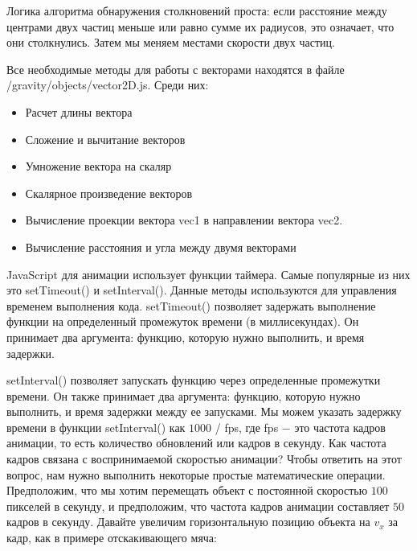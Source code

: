 Логика алгоритма обнаружения столкновений проста: если расстояние между центрами двух частиц меньше или равно сумме их радиусов, это означает, что они столкнулись. Затем мы меняем местами скорости двух частиц. \cite{canvas14}

Все необходимые методы для работы с векторами находятся в файле /gravity/objects/vector2D.js. Среди них:

\begin{itemize}
    \item Расчет длины вектора
    \item Сложение и вычитание векторов
    \item Умножение вектора на скаляр
    \item Скалярное произведение векторов
    \item Вычисление проекции вектора vec1 в направлении вектора vec2.
    \item Вычисление расстояния и угла между двумя векторами
\end{itemize}

JavaScript для анимации использует функции таймера. Самые популярные из них это setTimeout() и setInterval(). Данные методы используются для управления временем выполнения кода. setTimeout() позволяет задержать выполнение функции на определенный промежуток времени (в миллисекундах). Он принимает два аргумента: функцию, которую нужно выполнить, и время задержки.

setInterval() позволяет запускать функцию через определенные промежутки времени. Он также принимает два аргумента: функцию, которую нужно выполнить, и время задержки между ее запусками. Мы можем указать задержку времени в функции setInterval() как $1000$ / fps, где fps $-$ это частота кадров анимации, то есть количество обновлений или кадров в секунду. Как частота кадров связана с воспринимаемой скоростью анимации? Чтобы ответить на этот вопрос, нам нужно выполнить некоторые простые математические операции. Предположим, что мы хотим перемещать объект с постоянной скоростью $100$ пикселей в секунду, и предположим, что частота кадров анимации составляет $50$ кадров в секунду. Давайте увеличим горизонтальную позицию объекта на $v_x$ за кадр, как в примере отскакивающего мяча:


